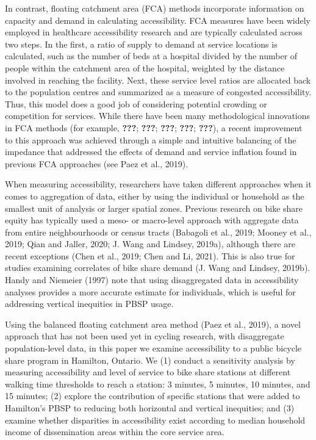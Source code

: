 \documentclass[]{elsarticle} %
\begin{document}
In contrast, floating catchment area (FCA) methods incorporate
information on capacity and demand in calculating accessibility. FCA
measures have been widely employed in healthcare accessibility research
and are typically calculated across two steps. In the first, a ratio of
supply to demand at service locations is calculated, such as the number
of beds at a hospital divided by the number of people within the
catchment area of the hospital, weighted by the distance involved in
reaching the facility. Next, these service level ratios are allocated
back to the population centres and summarized as a measure of congested
accessibility. Thus, this model does a good job of considering potential
crowding or competition for services. While there have been many
methodological innovations in FCA methods (for example, {\textbf{???}};
{\textbf{???}}; {\textbf{???}}; {\textbf{???}}; {\textbf{???}}), a
recent improvement to this approach was achieved through a simple and
intuitive balancing of the impedance that addressed the effects of
demand and service inflation found in previous FCA approaches (see Paez
et al., 2019).

When measuring accessibility, researchers have taken different
approaches when it comes to aggregation of data, either by using the
individual or household as the smallest unit of analysis or larger
spatial zones. Previous research on bike share equity has typically used
a meso- or macro-level approach with aggregate data from entire
neighbourhoods or census tracts (Babagoli et al., 2019; Mooney et al.,
2019; Qian and Jaller, 2020; J. Wang and Lindsey, 2019a), although there
are recent exceptions (Chen et al., 2019; Chen and Li, 2021). This is
also true for studies examining correlates of bike share demand (J. Wang
and Lindsey, 2019b). Handy and Niemeier (1997) note that using
disaggregated data in accessibility analyses provides a more accurate
estimate for individuals, which is useful for addressing vertical
inequities in PBSP usage.

Using the balanced floating catchment area method (Paez et al., 2019), a
novel approach that has not been used yet in cycling research, with
disaggregate population-level data, in this paper we examine
accessibility to a public bicycle share program in Hamilton, Ontario. We
(1) conduct a sensitivity analysis by measuring accessibility and level
of service to bike share stations at different walking time thresholds
to reach a station: 3 minutes, 5 minutes, 10 minutes, and 15 minutes;
(2) explore the contribution of specific stations that were added to
Hamilton's PBSP to reducing both horizontal and vertical inequities; and
(3) examine whether disparities in accessibility exist according to
median household income of dissemination areas within the core service
area.
\end{document}

